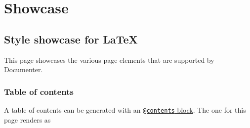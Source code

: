 \newcommand{\DocMainTitle}{Documenter LaTeX Showcase}
\newcommand{\DocVersion}{1.2.3}
\newcommand{\DocAuthors}{}
\newcommand{\JuliaVersion}{1.8.0}




\part{Showcase}


\chapter{Style showcase for \LaTeX}



\label{5852870456629818970}{}


This page showcases the various page elements that are supported by Documenter.



\section{Table of contents}



\label{11192443102986465861}{}


A table of contents can be generated with an \href{@ref}{\texttt{@contents} block}. The one for this page renders as


